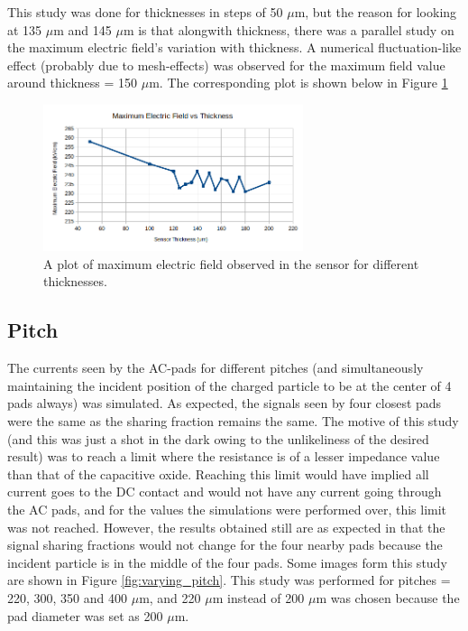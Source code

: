 \documentclass[11pt]{article}
\begin{document}
This study was done for thicknesses in steps of 50 $\mu$m, but the reason for looking at 135 $\mu$m and 145 $\mu$m is that alongwith thickness, there was a parallel study on the maximum electric field's variation with thickness. A numerical fluctuation-like effect (probably due to mesh-effects) was observed for the maximum field value around thickness = 150 $\mu$m. The corresponding plot is shown below in Figure \ref{fig:maxEF_vs_thickness}

\begin{figure}
    \centering
    \includegraphics[width=3in]{Images/maxEF_vs_thickness.png}
    \caption{A plot of maximum electric field observed in the sensor for different thicknesses.}
    \label{fig:maxEF_vs_thickness}
\end{figure}

\subsection{Pitch}
The currents seen by the AC-pads for different pitches (and simultaneously maintaining the incident position of the charged particle to be at the center of 4 pads always) was simulated. As expected, the signals seen by four closest pads were the same as the sharing fraction remains the same. The motive of this study (and this was just a shot in the dark owing to the unlikeliness of the desired result) was to reach a limit where the resistance is of a lesser impedance value than that of the capacitive oxide. Reaching this limit would have implied all current goes to the DC contact and would not have any current going through the AC pads, and for the values the simulations were performed over, this limit was not reached. However, the results obtained still are as expected in that the signal sharing fractions would not change for the four nearby pads because the incident particle is in the middle of the four pads. Some images form this study are shown in Figure \ref{fig:varying_pitch}. This study was performed for pitches = 220, 300, 350 and 400 $\mu$m, and 220 $\mu$m instead of 200 $\mu$m was chosen because the pad diameter was set as 200 $\mu$m.
\end{document}
